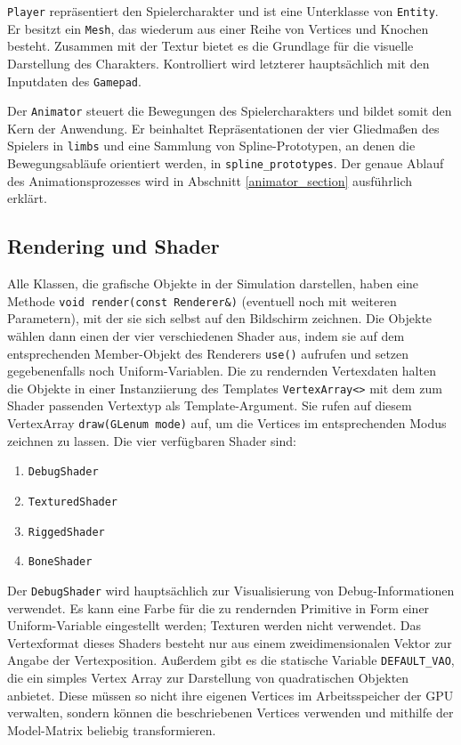 \lstinline{Player} repräsentiert den Spielercharakter und ist eine Unterklasse von \lstinline{Entity}. Er besitzt ein \lstinline{Mesh}, das wiederum aus einer Reihe von Vertices und Knochen besteht. Zusammen mit der Textur bietet es die Grundlage für die visuelle Darstellung des Charakters. Kontrolliert wird letzterer hauptsächlich mit den Inputdaten des \lstinline{Gamepad}.

Der \lstinline{Animator} steuert die Bewegungen des Spielercharakters und bildet somit den Kern der Anwendung. Er beinhaltet Repräsentationen der vier Gliedmaßen des Spielers in \lstinline{limbs} und eine Sammlung von Spline-Prototypen, an denen die Bewegungsabläufe orientiert werden, in \lstinline{spline_prototypes}. Der genaue Ablauf des Animationsprozesses wird in Abschnitt \ref{animator_section} ausführlich erklärt.


\subsection{Rendering und Shader} \label{rendering_section}
Alle Klassen, die grafische Objekte in der Simulation darstellen, haben eine Methode \lstinline{void render(const Renderer&)} (eventuell noch mit weiteren Parametern), mit der sie sich selbst auf den Bildschirm zeichnen. Die Objekte wählen dann einen der vier verschiedenen Shader aus, indem sie auf dem entsprechenden Member-Objekt des Renderers \lstinline{use()} aufrufen und setzen gegebenenfalls noch Uniform-Variablen. Die zu rendernden Vertexdaten halten die Objekte in einer Instanziierung des Templates \lstinline{VertexArray<>} mit dem zum Shader passenden Vertextyp als Template-Argument. Sie rufen auf diesem VertexArray \lstinline{draw(GLenum mode)} auf, um die Vertices im entsprechenden Modus zeichnen zu lassen. Die vier verfügbaren Shader sind:
\begin{enumerate}
    \item \lstinline{DebugShader}
    \item \lstinline{TexturedShader}
    \item \lstinline{RiggedShader}
    \item \lstinline{BoneShader}
\end{enumerate}

Der \lstinline{DebugShader} wird hauptsächlich zur Visualisierung von Debug-In\-for\-ma\-tio\-nen verwendet. Es kann eine Farbe für die zu rendernden Primitive in Form einer Uniform-Variable eingestellt werden; Texturen werden nicht verwendet. Das Vertexformat dieses Shaders besteht nur aus einem zweidimensionalen Vektor zur Angabe der Vertexposition. Außerdem gibt es die statische Variable \lstinline{DEFAULT_VAO}, die ein simples Vertex Array zur Darstellung von quadratischen Objekten anbietet. Diese müssen so nicht ihre eigenen Vertices im Arbeitsspeicher der GPU verwalten, sondern können die beschriebenen Vertices verwenden und mithilfe der Model-Matrix beliebig transformieren.

